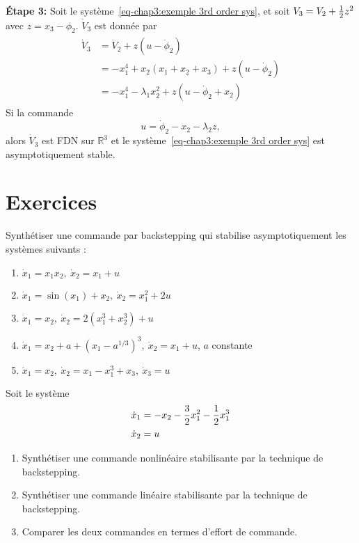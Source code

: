 \begin{example}
   \textbf{Étape 3:} Soit le système~\eqref{eq-chap3:exemple 3rd order sys}, et soit $V_3=V_2 + \frac{1}{2} z^2$ avec $z = x_3-\phi_2$. $\dot{V}_3$ est donnée par 
   \begin{align}
	   	\begin{split}
	   		\dot{V}_3 &= \dot{V}_2 + z\left(u-\dot{\phi}_2\right)\\
	   		&= -x_1^4 + x_2\left(x_1 +x_2 + x_3\right)+ z\left(u-\dot{\phi}_2\right) \\ 
	   		&= -x_1^4 -\lambda_1x_2^2 + z\left(u-\dot{\phi}_2+x_2\right)  
	   	\end{split}
   \end{align}
   Si la commande 
   \begin{equation}
   	u = \dot{\phi}_2-x_2-\lambda_2z,
   \end{equation} 
   alors $\dot{V}_3$ est FDN sur $\mathbb{R}^3$ et le système~\eqref{eq-chap3:exemple 3rd order sys} est asymptotiquement stable.
\end{example}

\newpage
\section{Exercices}
\begin{exercise}
	Synthétiser une commande par backstepping qui stabilise asymptotiquement les systèmes suivants : 
	\begin{enumerate}
		\item $\dot{x}_1 = x_1x_2, \ \dot{x}_2 = x_1 +u$
		\item $\dot{x}_1 = \sin(x_1)+x_2, \ \dot{x}_2 = x_1^2 +2u$
		\item $\dot{x}_1 = x_2, \ \dot{x}_2 = 2(x_1^3+x_2^3) +u$
		\item $\dot{x}_1 = x_2 + a + (x_1-a^{1/3})^3, \ \dot{x}_2 = x_1 +u$, $a$ constante
		\item $\dot{x}_1 = x_2, \ \dot{x}_2 = x_1 - x_1^3 +x_3, \ \dot{x}_3=u$
	\end{enumerate}
\end{exercise}
\begin{exercise}
	Soit le système 
	\begin{align}
	\begin{split}
		\dot{x}_1 &= -x_2-\frac{3}{2}x_1^2-\frac{1}{2} x_1^3\\
		\dot{x}_2 &=u
	\end{split}
	\end{align}
	\begin{enumerate}
		\item Synthétiser une commande nonlinéaire stabilisante par la technique de backstepping.
		\item Synthétiser une commande linéaire stabilisante par la technique de backstepping.
		\item Comparer les deux commandes en termes d'effort de commande.
	\end{enumerate}
\end{exercise}

